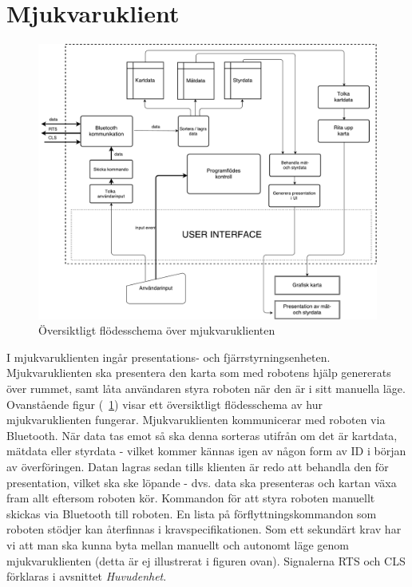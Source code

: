 \documentclass{article}
\begin{document}
\section{Mjukvaruklient}
\begin{figure}[H]
\centering
\includegraphics[scale=0.3]{mjukvaruklient_flowchart3}
\caption{Översiktligt flödesschema över mjukvaruklienten}
\label{fig:mjukvaruklient}
\end{figure}
I mjukvaruklienten ingår presentations- och fjärrstyrningsenheten. Mjukvaruklienten ska presentera den karta som med robotens hjälp genererats över rummet, samt låta användaren styra roboten när den är i sitt manuella läge. Ovanstående figur (~\ref{fig:mjukvaruklient}) visar ett översiktligt flödesschema av hur mjukvaruklienten fungerar. Mjukvaruklienten kommunicerar med roboten via Bluetooth. När data tas emot så ska denna sorteras utifrån om det är kartdata, mätdata eller styrdata - vilket kommer kännas igen av någon form av ID i början av överföringen. Datan lagras sedan tills klienten är redo att behandla den för presentation, vilket ska ske löpande - dvs. data ska presenteras och kartan växa fram allt eftersom roboten kör. Kommandon för att styra roboten manuellt skickas via Bluetooth till roboten. En lista på förflyttningskommandon som roboten stödjer kan återfinnas i kravspecifikationen. Som ett sekundärt krav har vi att man ska kunna byta mellan manuellt och autonomt läge genom mjukvaruklienten (detta är ej illustrerat i figuren ovan). Signalerna RTS och CLS förklaras i avsnittet \textit{Huvudenhet}. 

\clearpage

\nocite{*}
{}

\end{document}
